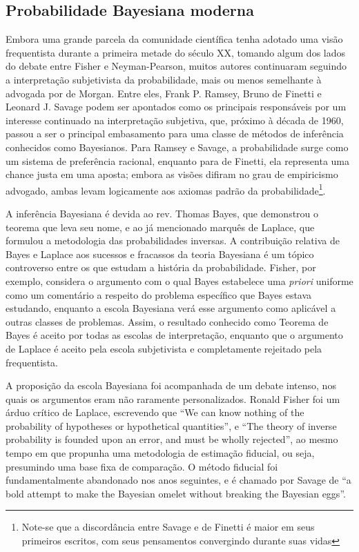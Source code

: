 \documentclass[12pt,a4paper]{article}
\begin{document}
\subsection{Probabilidade Bayesiana moderna}\label{sec:bayes}
Embora uma grande parcela da comunidade científica tenha adotado uma visão frequentista durante a primeira metade do século XX,
tomando algum dos lados do debate entre Fisher e Neyman-Pearson, muitos autores continuaram seguindo a interpretação 
subjetivista da probabilidade, mais ou menos semelhante à advogada por de Morgan. Entre eles, Frank P. Ramsey, 
Bruno de Finetti e Leonard J. Savage
podem ser apontados como os principais responsáveis por um interesse continuado na interpretação subjetiva, que, próximo à
década de 1960, passou a ser o principal embasamento para uma classe de métodos de inferência conhecidos como Bayesianos. 
Para Ramsey e Savage, a probabilidade surge como um sistema de preferência racional, enquanto para de Finetti, ela representa
uma chance justa em uma aposta; embora as visões difiram no grau de empiricismo advogado,
ambas levam logicamente aos axiomas padrão da probabilidade\footnote{Note-se que a discordância entre Savage e de Finetti é
maior em seus primeiros escritos, com seus pensamentos convergindo durante suas vidas}.

A inferência Bayesiana é devida ao rev. Thomas Bayes, que demonstrou o teorema que leva seu nome, e ao já mencionado marquês de
Laplace, que formulou a metodologia das probabilidades inversas. A contribuição relativa de Bayes e Laplace aos sucessos
e fracassos da teoria Bayesiana é um tópico controverso	entre os que estudam a história da probabilidade\cite{Zabell09}.
Fisher, por exemplo, considera o argumento com o qual Bayes estabelece uma {\em priori} uniforme como um comentário
a respeito do problema específico que Bayes estava estudando, enquanto a escola Bayesiana verá esse argumento
como aplicável a outras classes de problemas\cite{Aldrich08}. Assim, o resultado conhecido como Teorema de Bayes é aceito
por todas as escolas de interpretação, enquanto que o argumento de Laplace 
é aceito pela escola subjetivista e completamente rejeitado pela frequentista. 

A proposição da escola Bayesiana foi acompanhada de um debate intenso, nos quais os argumentos eram não raramente personalizados.
Ronald Fisher foi um árduo crítico
de Laplace, escrevendo que ``We can know nothing of the probability of hypotheses or hypothetical quantities''\cite{Fisher1921},
e ``The theory of inverse probability is founded upon an error, and must be wholly rejected''\cite{Fisher1925}, ao mesmo tempo
em que propunha uma metodologia de estimação fiducial, ou seja, presumindo uma base fixa de comparação. O método fiducial foi
fundamentalmente abandonado nos anos seguintes, e é chamado por Savage de ``a bold attempt to make the Bayesian omelet without
breaking the Bayesian eggs''\cite{Savage60}. 
\end{document}
